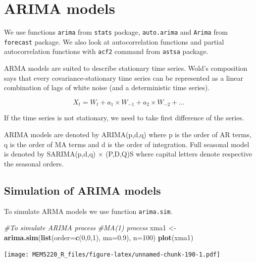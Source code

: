 \documentclass[]{book}
\newenvironment{Shaded}{\begin{snugshade}}{\end{snugshade}}
\newcommand{\CommentTok}[1]{\textcolor[rgb]{0.56,0.35,0.01}{\textit{#1}}}
\newcommand{\DataTypeTok}[1]{\textcolor[rgb]{0.13,0.29,0.53}{#1}}
\newcommand{\DecValTok}[1]{\textcolor[rgb]{0.00,0.00,0.81}{#1}}
\newcommand{\FloatTok}[1]{\textcolor[rgb]{0.00,0.00,0.81}{#1}}
\newcommand{\KeywordTok}[1]{\textcolor[rgb]{0.13,0.29,0.53}{\textbf{#1}}}
\newcommand{\NormalTok}[1]{#1}
\newcommand{\StringTok}[1]{\textcolor[rgb]{0.31,0.60,0.02}{#1}}
\begin{document}
\hypertarget{arima-models}{%
\section{ARIMA models}\label{arima-models}}

We use functions \texttt{arima} from \texttt{stats} package, \texttt{auto.arima} and \texttt{Arima} from \texttt{forecast} package.
We also look at autocorrelation functions and partial autocorrelation functions with \texttt{acf2} command from \texttt{astsa} package.

ARMA models are suited to describe stationary time series. Wold's composition says that every covariance-stationary time series can be represented as a linear combination of lags of white noise (and a deterministic time series).

\[
X_t = W_t + a_1 \times W_{-1}+ a_2 \times W_{-2} + \dots
\]

If the time series is not stationary, we need to take first difference of the series.

ARIMA models are denoted by ARIMA(p,d,q) where p is the order of AR terms, q is the order of MA terms and d is the order of integration. Full seasonal model is denoted by SARIMA(p,d,q) \(\times\) (P,D,Q)S where capital letters denote respective the seasonal orders.

\hypertarget{simulation-of-arima-models}{%
\subsection{Simulation of ARIMA models}\label{simulation-of-arima-models}}

To simulate ARMA models we use function \texttt{arima.sim}.

\begin{Shaded}
\begin{Highlighting}[]
\CommentTok{#To simulate ARIMA process}
\CommentTok{#MA(1) process}
\NormalTok{xma1 <-}\StringTok{ }\KeywordTok{arima.sim}\NormalTok{(}\KeywordTok{list}\NormalTok{(}\DataTypeTok{order=}\KeywordTok{c}\NormalTok{(}\DecValTok{0}\NormalTok{,}\DecValTok{0}\NormalTok{,}\DecValTok{1}\NormalTok{), }\DataTypeTok{ma=}\FloatTok{0.9}\NormalTok{), }\DataTypeTok{n=}\DecValTok{100}\NormalTok{)}
\KeywordTok{plot}\NormalTok{(xma1)}
\end{Highlighting}
\end{Shaded}

\texttt{[image: MEM5220\_R\_files/figure-latex/unnamed-chunk-190-1.pdf]}
\end{document}
